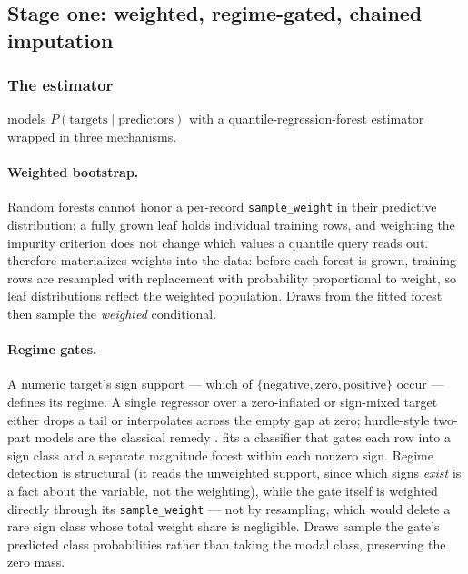 \subsection{Stage one: weighted, regime-gated, chained imputation}
\label{imp:sec:methodology}

\subsubsection{The estimator}
\label{imp:sec:estimator}

\populacefit{} models $P(\text{targets} \mid \text{predictors})$ with a
quantile-regression-forest estimator \citep{meinshausen2006quantile,
zillow2024quantile} wrapped in three mechanisms.

\paragraph{Weighted bootstrap.} Random forests cannot honor a per-record
\texttt{sample\_weight} in their predictive distribution: a fully grown leaf
holds individual training rows, and weighting the impurity criterion does not
change which values a quantile query reads out. \populacefit{} therefore
materializes weights into the data: before each forest is grown, training rows
are resampled with replacement with probability proportional to weight, so
leaf distributions reflect the weighted population. Draws from the fitted
forest then sample the \emph{weighted} conditional.

\paragraph{Regime gates.} A numeric target's sign support --- which of
$\{\text{negative}, \text{zero}, \text{positive}\}$ occur --- defines its
regime. A single regressor over a zero-inflated or sign-mixed target either
drops a tail or interpolates across the empty gap at zero; hurdle-style
two-part models are the classical remedy \citep{mullahy1986specification,
lambert1992zero}. \populacefit{} fits a classifier that gates each row into a
sign class and a separate magnitude forest within each nonzero sign. Regime
detection is structural (it reads the unweighted support, since which signs
\emph{exist} is a fact about the variable, not the weighting), while the gate
itself is weighted directly through its \texttt{sample\_weight} --- not by
resampling, which would delete a rare sign class whose total weight share is
negligible. Draws sample the gate's predicted class probabilities rather than
taking the modal class, preserving the zero mass.

